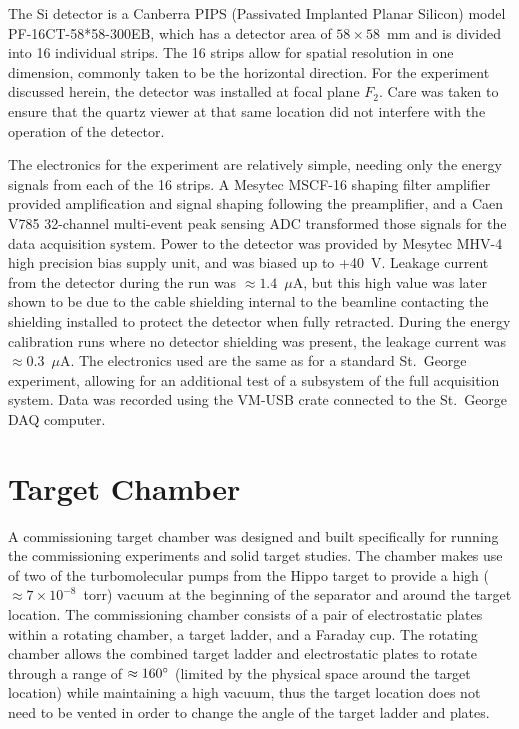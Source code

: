 The Si detector is a Canberra PIPS (Passivated Implanted Planar Silicon)
model PF-16CT-58*58-300EB, which has a detector area of $58\times 58$~mm
and is divided into 16 individual strips. The 16 strips allow for spatial
resolution in one dimension, commonly taken to be the horizontal direction.
For the experiment discussed herein, the detector was installed at focal plane
$F_2$. Care was taken to ensure that the quartz viewer at that same location
did not interfere with the operation of the detector.

The electronics for the experiment are relatively simple, needing only the
energy signals from each of the 16 strips. A Mesytec MSCF-16 shaping filter
amplifier provided amplification and signal shaping following the preamplifier,
and a Caen V785 32-channel multi-event peak sensing ADC transformed those
signals for the data acquisition system. Power to the detector was provided by
Mesytec MHV-4 high precision bias supply unit, and was biased up to +40~V.
Leakage current from the detector during the run was $\approx 1.4$~$\mu$A, but
this high value was later shown to be due to the cable shielding internal to
the beamline contacting the shielding installed to protect the detector when
fully retracted. During the energy calibration runs where no detector shielding
was present, the leakage current was $\approx 0.3$~$\mu$A. The electronics used
are the same as for a standard St.\ George experiment, allowing for an
additional test of a subsystem of the full acquisition system. Data was
recorded using the VM-USB crate connected to the St.\ George DAQ
computer.


\section{Target Chamber}
\label{sec:target}

A commissioning target chamber was designed and built specifically for running
the commissioning experiments and solid target studies. The chamber makes use
of two of the turbomolecular pumps from the Hippo target to provide a high
($\approx 7\times 10^{-8}$~torr) vacuum at the beginning of the separator and
around the target location. The commissioning chamber consists of a pair of
electrostatic plates within a rotating chamber, a target ladder, and a Faraday
cup. The rotating chamber allows the combined target ladder and electrostatic
plates to rotate through a range of $\approx 160\degree$ (limited by the
physical space around the target location) while maintaining a high vacuum,
thus the target location does not need to be vented in order to change the
angle of the target ladder and plates.

